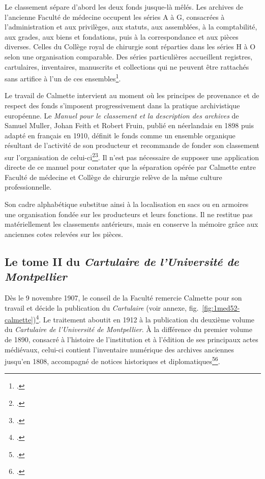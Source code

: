 Le classement sépare d'abord les deux fonds jusque-là mêlés. Les archives de l'ancienne Faculté de médecine occupent les séries A à G, consacrées à l'administration et aux privilèges, aux statuts, aux assemblées, à la comptabilité, aux grades, aux biens et fondations, puis à la correspondance et aux pièces diverses. Celles du Collège royal de chirurgie sont réparties dans les séries H à O selon une organisation comparable. Des séries particulières accueillent registres, cartulaires, inventaires, manuscrits et collections qui ne peuvent être rattachés sans artifice à l'un de ces ensembles\footcite[p.~XXX-XXXII, vues~52 à 54 de la version numérisée, suivies de notices sur les différentes séries et de transcriptions]{CalmetteCartulaire1912}.

Le travail de Calmette intervient au moment où les principes de provenance et de respect des fonds s'imposent progressivement dans la pratique archivistique européenne. Le \emph{Manuel pour le classement et la description des archives} de Samuel Muller, Johan Feith et Robert Fruin, publié en néerlandais en 1898 puis adapté en français en 1910, définit le fonds comme un ensemble organique résultant de l'activité de son producteur et recommande de fonder son classement sur l'organisation de celui-ci\footcite{MullerFeithFruin1910}\footcite{Duchein1977RespectFonds}. Il n'est pas nécessaire de supposer une application directe de ce manuel pour constater que la séparation opérée par Calmette entre Faculté de médecine et Collège de chirurgie relève de la même culture professionnelle.

Son cadre alphabétique substitue ainsi à la localisation en sacs ou en armoires une organisation fondée sur les producteurs et leurs fonctions. Il ne restitue pas matériellement les classements antérieurs, mais en conserve la mémoire grâce aux anciennes cotes relevées sur les pièces.

\subsection{Le tome II du \emph{Cartulaire de l'Université de Montpellier}}

Dès le 9 novembre 1907, le conseil de la Faculté remercie Calmette pour son travail et décide la publication du \emph{Cartulaire} (voir annexe, fig.~\ref{fig:1med52-calmette})\footcite{AHFM1MED52}. Le traitement aboutit en 1912 à la publication du deuxième volume du \emph{Cartulaire de l'Université de Montpellier}. À la différence du premier volume de 1890, consacré à l'histoire de l'institution et à l'édition de ses principaux actes médiévaux, celui-ci contient l'inventaire numérique des archives anciennes jusqu'en 1808, accompagné de notices historiques et diplomatiques\footcite{Fournier1913Cartulaire}\footcite{Galabert1914Cartulaire}.

